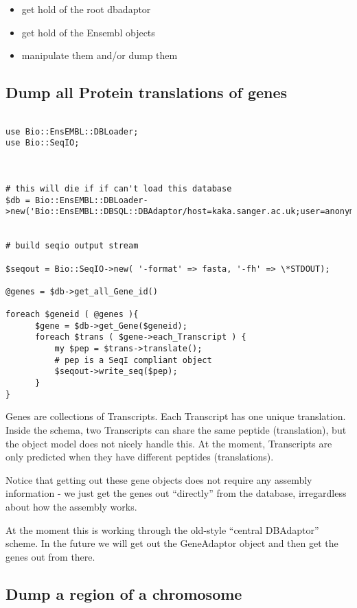 \documentclass[11pt,a4paper]{article}
\begin{document}
\begin{itemize}
\item get hold of the root dbadaptor 
\item get hold of the Ensembl objects 
\item manipulate them and/or dump them
\end{itemize} 


\subsection{Dump all Protein translations of genes}

\begin{verbatim}

use Bio::EnsEMBL::DBLoader;
use Bio::SeqIO;



# this will die if if can't load this database
$db = Bio::EnsEMBL::DBLoader->new('Bio::EnsEMBL::DBSQL::DBAdaptor/host=kaka.sanger.ac.uk;user=anonymous;dbname=current');


# build seqio output stream

$seqout = Bio::SeqIO->new( '-format' => fasta, '-fh' => \*STDOUT);

@genes = $db->get_all_Gene_id()

foreach $geneid ( @genes ){
      $gene = $db->get_Gene($geneid);
      foreach $trans ( $gene->each_Transcript ) {
          my $pep = $trans->translate();
          # pep is a SeqI compliant object
          $seqout->write_seq($pep);
      }
}

\end{verbatim}

Genes are collections of Transcripts. Each Transcript has one unique
translation. Inside the schema, two Transcripts can share the same
peptide (translation), but the object model does not nicely handle
this. At the moment, Transcripts are only predicted when they have
different peptides (translations).

Notice that getting out these gene objects does not require any
assembly information - we just get the genes out ``directly'' from the
database, irregardless about how the assembly works.

At the moment this is working through the old-style ``central
DBAdaptor'' scheme. In the future we will get out the GeneAdaptor
object and then get the genes out from there. 


\subsection{Dump a region of a chromosome}
\end{document}
